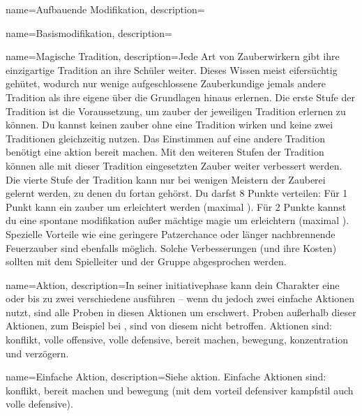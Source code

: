 {
    name={Aufbauende Modifikation},
    description={}}

{
    name={Basismodifikation},
    description={}}

{
    name={Magische Tradition},
    description={Jede Art von Zauberwirkern gibt ihre einzigartige Tradition an ihre Schüler weiter. Dieses Wissen meist eifersüchtig gehütet, wodurch nur wenige aufgeschlossene Zauberkundige jemals andere Tradition als ihre eigene über die Grundlagen hinaus erlernen. Die erste Stufe der Tradition ist die Voraussetzung, um \gls{zauber} der jeweiligen Tradition erlernen zu können. Du kannst keinen \gls{zauber} ohne eine Tradition wirken und keine zwei Traditionen gleichzeitig nutzen. Das Einstimmen auf eine andere Tradition benötigt eine \gls{aktion} \gls{bereit machen}. Mit den weiteren Stufen der Tradition können alle mit dieser Tradition eingesetzten \gls{Zauber} weiter verbessert werden. Die vierte Stufe der Tradition kann nur bei wenigen Meistern der Zauberei gelernt werden, zu denen du fortan gehörst. Du darfst 8 Punkte verteilen: Für 1 Punkt kann ein \gls{zauber} um  erleichtert werden (maximal ). Für 2 Punkte kannst du eine \gls{spontane modifikation} außer \gls{mächtige magie} um  erleichtern (maximal ). Spezielle Vorteile wie eine geringere Patzerchance oder länger nachbrennende Feuerzauber sind ebenfalls möglich. Solche Verbesserungen (und ihre Kosten) sollten mit dem Spielleiter und der Gruppe abgesprochen werden.}}
        
            
    

{
    name={Aktion},
    description={In seiner \gls{initiativephase} kann dein Charakter eine  oder bis zu zwei verschiedene  ausführen – wenn du jedoch zwei einfache Aktionen nutzt, sind alle Proben in diesen Aktionen um  erschwert. Proben außerhalb dieser Aktionen, zum Beispiel bei , sind von diesem  nicht betroffen. Aktionen sind: \gls{konflikt}, \gls{volle offensive}, \gls{volle defensive}, \gls{bereit machen}, \gls{bewegung}, \gls{konzentration} und \gls{verzögern}.}}

{
    name={Einfache Aktion},
    description={Siehe \gls{aktion}. Einfache Aktionen sind: \gls{konflikt}, \gls{bereit machen} und \gls{bewegung} (mit dem \gls{vorteil} \gls{defensiver kampfstil} auch \gls{volle defensive}).}}

